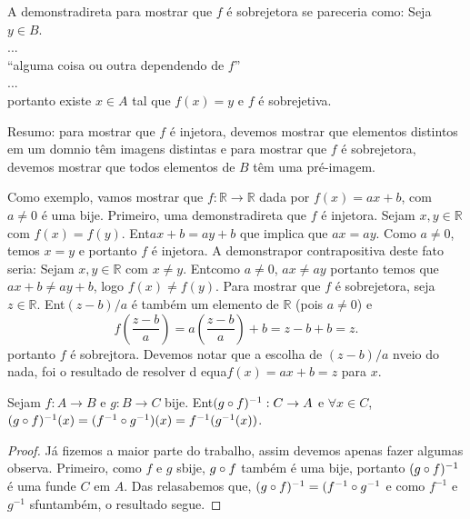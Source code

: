 A demonstra\cao direta para mostrar que $f$ \'e sobrejetora se pareceria como: Seja $y\in B$.
\\
...
\\ 
``alguma coisa ou outra dependendo de $f$''
\\
...
\\
portanto existe $x\in A$ tal que $f(x)=y$ e $f$ \'e sobrejetiva.

Resumo: para mostrar que $f$ \'e injetora, devemos mostrar que elementos distintos em um dom\ih nio t\^em imagens distintas e para mostrar que $f$ \'e sobrejetora, devemos mostrar que todos elementos de $B$ t\^em uma pr\'e-imagem.

Como exemplo, vamos mostrar que $f:\mathbb{R}\to\mathbb{R}$ dada por $f(x)=ax+b$, com $a\neq 0$ \'e uma bije\caoi. Primeiro, uma demonstra\cao direta que $f$ \'e injetora. Sejam $x,y\in\mathbb{R}$ com $f(x)=f(y)$. Ent\ao $ax+b=ay+b$ que implica que $ax=ay$. Como $a\neq 0$, temos $x=y$ e portanto $f$ \'e injetora. A demonstra\cao por contrapositiva deste fato seria: Sejam $x,y\in\mathbb{R}$ com $x\neq y$. Ent\ao como $a\neq 0$, $ax\neq ay$ portanto temos que $ax+b\neq ay+b$, logo $f(x)\neq f(y)$. Para mostrar que $f$ \'e sobrejetora, seja $z\in\mathbb{R}$. Ent\ao $(z-b)/a$ \'e tamb\'em um elemento de $\mathbb{R}$ (pois $a\neq 0$) e
\[
f\left(\frac{z-b}{a}\right)= a\left(\frac{z-b}{a}\right)+b=z-b+b=z.
\] 
portanto $f$ \'e sobrejtora. Devemos notar que a escolha de $(z-b)/a$ n\ao veio do nada, foi o resultado de resolver d equa\cao $f(x)=ax+b=z$ para $x$.
\begin{teob}\label{functeo16}
Sejam $f:A\to B$ e $g:B\to C$ bije\cois. Ent\ao $(g\circ f)^{-1}:C\to A$ e $\forall x\in C$, $(g\circ f)^{-1}(x)=(f^{-1}\circ g^{-1})(x)=f^{-1}(g^{-1}(x))$. 
\end{teob}
\begin{proof}
J\'a fizemos a maior parte do trabalho, assim devemos apenas fazer algumas observa\cois. Primeiro, como $f$ e $g$ s\ao bije\cois, $g\circ f$ tamb\'em \'e uma bije\caoi, portanto $(g\circ f)^{-1}$ \'e uma fun\cao de $C$ em $A$. Das rela\coes sabemos que, $(g\circ f)^{-1}=(f^{-1}\circ g^{-1}$ e como $f^{-1}$ e $g^{-1}$ s\ao fun\coes tamb\'em, o resultado segue.
\end{proof}
\\


